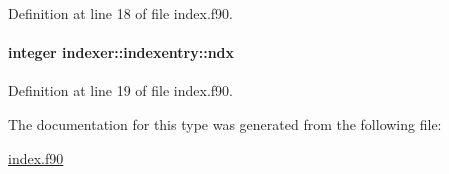 Definition at line 18 of file index.\-f90.

\hypertarget{structindexer_1_1indexentry_a66eef07d27b9f348c73f906de1f8298b}{
\paragraph[{ndx}]{\setlength{\rightskip}{0pt plus 5cm}integer indexer\-::indexentry\-::ndx}}\label{structindexer_1_1indexentry_a66eef07d27b9f348c73f906de1f8298b}


Definition at line 19 of file index.\-f90.



The documentation for this type was generated from the following file\-:\begin{DoxyCompactItemize}
\item 
\hyperlink{index_8f90}{index.\-f90}\end{DoxyCompactItemize}
